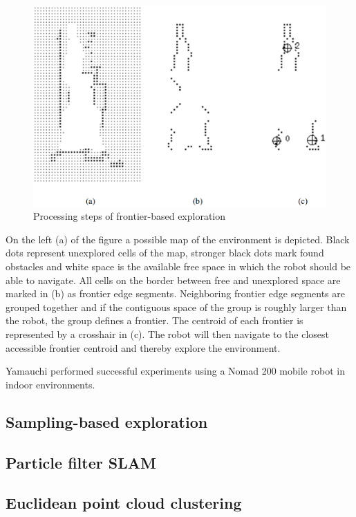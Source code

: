 \documentclass[a4paper,11pt,english]{article}
\begin{document}
\begin{figure}[h!]
	\begin{center}
		\includegraphics[width=1\textwidth]{src/frontier_exploration.png}
		\caption{ Processing steps of frontier-based exploration \cite{yamauchi1997frontier}}
		\label{fig:frontier}
	\end{center}
\end{figure}

On the left (a) of the figure a possible map of the environment is depicted. Black dots represent unexplored cells of the map, stronger black dots mark found obstacles and white space is the available free space in which the robot should be able to navigate.
All cells on the border between free and unexplored space are marked in (b) as frontier edge segments.
Neighboring frontier edge segments are grouped together and if the contiguous space of the group is roughly larger than the robot, the group defines a frontier. The centroid of each frontier is represented by a crosshair in (c).
The robot will then navigate to the closest accessible frontier centroid and thereby explore the environment.

Yamauchi performed successful experiments using a Nomad 200 mobile robot in indoor environments.

\subsection{Sampling-based exploration}
\subsection{Particle filter SLAM}
\subsection{Euclidean point cloud clustering}
\end{document}
